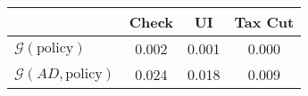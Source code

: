 \begin{tabular}{@{}lccc@{}} 
\toprule 
                          & Check      & UI    & Tax Cut    \\  \midrule 
$\mathcal{G}(\text{policy})$ & 0.002  & 0.001  & 0.000     \\ 
$\mathcal{G}(AD,\text{policy})$ & 0.024  & 0.018  & 0.009     \\ 
\end{tabular}  

